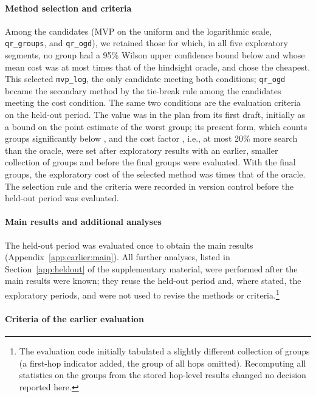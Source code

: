 \paragraph*{Method selection and criteria}
Among the candidates (MVP on the uniform and the logarithmic scale,
\texttt{qr\_groups}, and \texttt{qr\_ogd}), we retained those for which, in all
five exploratory segments, no group had a 95\% Wilson upper confidence bound below
\groupBar and whose mean cost was at most \costFactor{} times that of the hindsight
oracle, and chose the cheapest. This selected
\texttt{mvp\_log}, the only candidate meeting both conditions; \texttt{qr\_ogd}
became the secondary method by the tie-break rule among the candidates meeting the
cost condition. The same two conditions are the evaluation criteria on the
held-out period. The value \groupBar{} was in the plan from its first draft,
initially as a bound on the point estimate of the worst group; its present form,
which counts groups significantly below \groupBar, and the cost factor
\costFactor, i.e., at most 20\% more search than the oracle, were set after
exploratory results with an earlier, smaller collection of groups and before the
final groups were evaluated. With the final groups, the exploratory cost of the
selected method was \explMvpLogCostRatioMean{} times that of the oracle. The
selection rule and the criteria were recorded in version control before the
held-out period was evaluated.

\paragraph*{Main results and additional analyses}
The held-out period was evaluated once to obtain the main results
(Appendix~\ref{app:earlier:main}). All further analyses, listed in
Section~\ref{app:heldout} of the supplementary material, were performed after the main results were known;
they reuse the held-out period and, where stated, the exploratory periods, and
were not used to revise the methods or criteria.\footnote{The evaluation code
initially tabulated a slightly different collection of groups (a first-hop
indicator added, the group of all hops omitted). Recomputing all statistics on
the \numGroups{} groups from the stored hop-level results changed no decision
reported here.}

\paragraph*{Criteria of the earlier evaluation}

